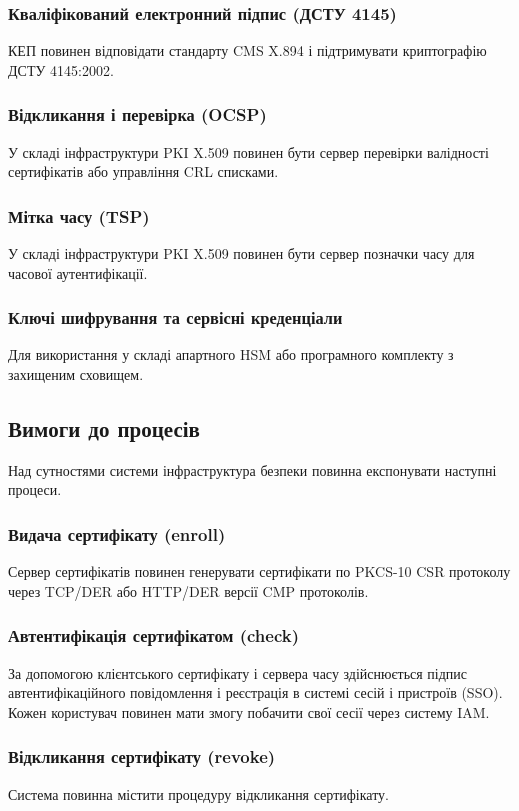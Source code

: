 \documentclass{article}
\begin{document}
\subsubsection{Кваліфікований електронний підпис (ДСТУ 4145)}
КЕП повинен відповідати стандарту CMS X.894 і підтримувати криптографію ДСТУ 4145:2002.

\subsubsection{Відкликання і перевірка (OCSP)}
У складі інфраструктури PKI X.509 повинен бути сервер перевірки валідності сертифікатів або управління CRL списками.

\subsubsection{Мітка часу (TSP)}
У складі інфраструктури PKI X.509 повинен бути сервер позначки часу для часової аутентифікації.

\subsubsection{Ключі шифрування та сервісні креденціали}
Для використання у складі апартного HSM або програмного комплекту з захищеним сховищем.

\newpage
\subsection{Вимоги до процесів}
Над сутностями системи інфраструктура безпеки повинна експонувати наступні процеси.

\subsubsection{Видача сертифікату (enroll)}
Сервер сертифікатів повинен генерувати сертифікати по PKCS-10 CSR протоколу через TCP/DER або HTTP/DER версії CMP протоколів.

\subsubsection{Автентифікація сертифікатом (check)}
За допомогою клієнтського сертифікату і сервера часу здійснюється підпис автентифікаційного повідомлення і реєстрація
в системі сесій і пристроїв (SSO). Кожен користувач повинен мати змогу побачити свої сесії через систему IAM.

\subsubsection{Відкликання сертифікату (revoke)}
Система повинна містити процедуру відкликання сертифікату.
\end{document}
